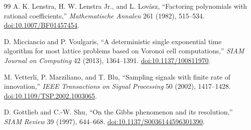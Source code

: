 \begin{thebibliography}{99}
A. K. Lenstra, H. W. Lenstra Jr., and L. Lov\'asz,
``Factoring polynomials with rational coefficients,''
\emph{Mathematische Annalen} 261 (1982), 515--534.
\href{https://doi.org/10.1007/BF01457454}{doi:10.1007/BF01457454}.

D. Micciancio and P. Voulgaris,
``A deterministic single exponential time algorithm for most lattice problems based on Voronoi cell computations,''
\emph{SIAM Journal on Computing} 42 (2013), 1364--1391.
\href{https://doi.org/10.1137/100811970}{doi:10.1137/100811970}.

M. Vetterli, P. Marziliano, and T. Blu,
``Sampling signals with finite rate of innovation,''
\emph{IEEE Transactions on Signal Processing} 50 (2002), 1417--1428.
\href{https://doi.org/10.1109/TSP.2002.1003065}{doi:10.1109/TSP.2002.1003065}.

D. Gottlieb and C.-W. Shu,
``On the Gibbs phenomenon and its resolution,''
\emph{SIAM Review} 39 (1997), 644--668.
\href{https://doi.org/10.1137/S0036144596301390}{doi:10.1137/S0036144596301390}.

\end{thebibliography}

